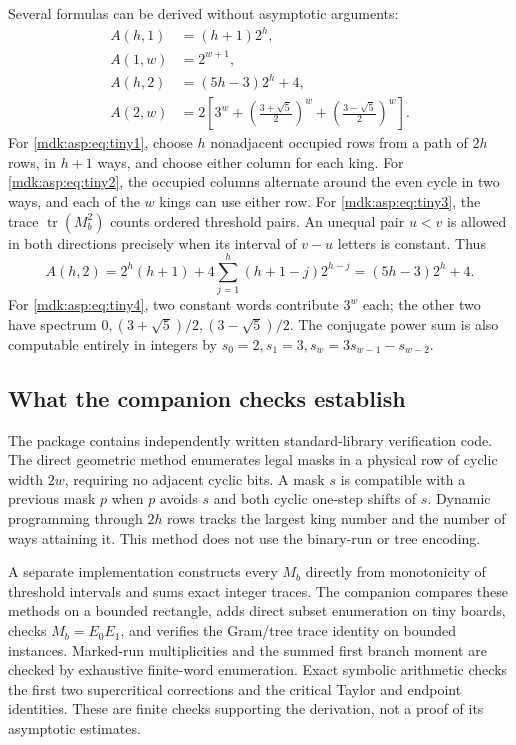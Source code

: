 \documentclass[11pt,letterpaper]{article}
\numberwithin{equation}{section}
\theoremstyle{remark}\newtheorem{remark}[theorem]{Remark}
\DeclareMathOperator{\tr}{tr}\DeclareMathOperator{\TV}{TV}
\begin{document}
Several formulas can be derived without asymptotic arguments:
\begin{align}
A(h,1)&=(h+1)2^h,\label{mdk:asp:eq:tiny1}\\
A(1,w)&=2^{w+1},\label{mdk:asp:eq:tiny2}\\
A(h,2)&=(5h-3)2^h+4,\label{mdk:asp:eq:tiny3}\\
A(2,w)&=2\left[3^w+\left(\frac{3+\sqrt5}{2}\right)^w+
                       \left(\frac{3-\sqrt5}{2}\right)^w\right].\label{mdk:asp:eq:tiny4}
\end{align}
For \eqref{mdk:asp:eq:tiny1}, choose $h$ nonadjacent occupied rows from a path of $2h$ rows, in $h+1$ ways, and choose either column for each king. For \eqref{mdk:asp:eq:tiny2}, the occupied columns alternate around the even cycle in two ways, and each of the $w$ kings can use either row. For \eqref{mdk:asp:eq:tiny3}, the trace $\tr(M_b^2)$ counts ordered threshold pairs. An unequal pair $u<v$ is allowed in both directions precisely when its interval of $v-u$ letters is constant. Thus
\[
A(h,2)=2^h(h+1)+4\sum_{j=1}^h(h+1-j)2^{h-j}=(5h-3)2^h+4.
\]
For \eqref{mdk:asp:eq:tiny4}, two constant words contribute $3^w$ each; the other two have spectrum $0,(3+\sqrt5)/2,(3-\sqrt5)/2$. The conjugate power sum is also computable entirely in integers by $s_0=2,s_1=3,s_w=3s_{w-1}-s_{w-2}$.

\subsection{What the companion checks establish}
The package contains independently written standard-library verification code. The direct geometric method enumerates legal masks in a physical row of cyclic width $2w$, requiring no adjacent cyclic bits. A mask $s$ is compatible with a previous mask $p$ when $p$ avoids $s$ and both cyclic one-step shifts of $s$. Dynamic programming through $2h$ rows tracks the largest king number and the number of ways attaining it. This method does not use the binary-run or tree encoding.

A separate implementation constructs every $M_b$ directly from monotonicity of threshold intervals and sums exact integer traces. The companion compares these methods on a bounded rectangle, adds direct subset enumeration on tiny boards, checks $M_b=E_0E_1$, and verifies the Gram/tree trace identity on bounded instances. Marked-run multiplicities and the summed first branch moment are checked by exhaustive finite-word enumeration. Exact symbolic arithmetic checks the first two supercritical corrections and the critical Taylor and endpoint identities. These are finite checks supporting the derivation, not a proof of its asymptotic estimates.
\end{document}

